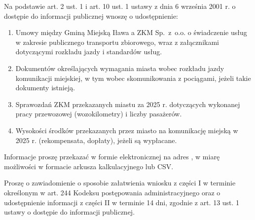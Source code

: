 
Na podstawie art. 2 ust. 1 i art. 10 ust. 1 ustawy z dnia 6 września 2001 r. o dostępie do informacji publicznej wnoszę o udostępnienie:
\begin{enumerate}
\item Umowy między Gminą Miejską Iława a ZKM Sp.\ z~o.o. o świadczenie usług w zakresie publicznego transportu zbiorowego, wraz z załącznikami dotyczącymi rozkładu jazdy i standardów usług.
\item Dokumentów określających wymagania miasta wobec rozkładu jazdy komunikacji miejskiej, w tym wobec skomunikowania z pociągami, jeżeli takie dokumenty istnieją.
\item Sprawozdań ZKM przekazanych miastu za 2025 r. dotyczących wykonanej pracy przewozowej (wozokilometry) i liczby pasażerów.
\item Wysokości środków przekazanych przez miasto na komunikację miejską w 2025 r. (rekompensata, dopłaty), jeżeli są wypłacane.
\end{enumerate}

Informacje proszę przekazać w formie elektronicznej na adres \EmailNadawcy, w miarę możliwości w formacie arkusza kalkulacyjnego lub CSV.

Proszę o zawiadomienie o sposobie załatwienia wniosku z części I w terminie określonym w art. 244 Kodeksu postępowania administracyjnego oraz o udostępnienie informacji z części II w terminie 14 dni, zgodnie z art. 13 ust. 1 ustawy o dostępie do informacji publicznej.

\Podpis

\MaterialyIZalaczniki

\Zalaczniki

